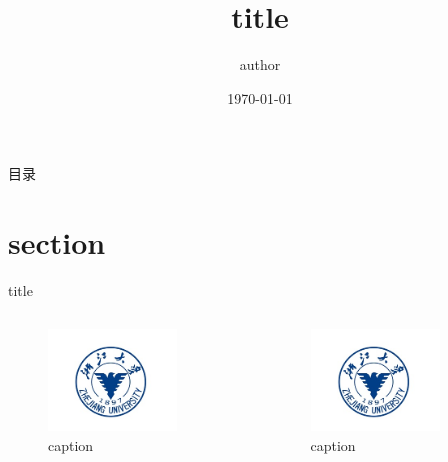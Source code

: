 \documentclass{beamer}
\title{title}
\author{author}
\institute{institute}
\date{\today}
\begin{document}
\frame{\titlepage}

\begin{frame}{目录}
    \tableofcontents
\end{frame}

\section{section}
\begin{frame}{title}
    \begin{columns}
        \begin{figure}
            \includegraphics[width=0.8\textwidth]{figure.png}
            \caption{caption}
        \end{figure}
        \begin{figure}
            \includegraphics[width=0.8\textwidth]{figure.png}
            \caption{caption}
        \end{figure}
    \end{columns}
\end{frame}
\end{document}
